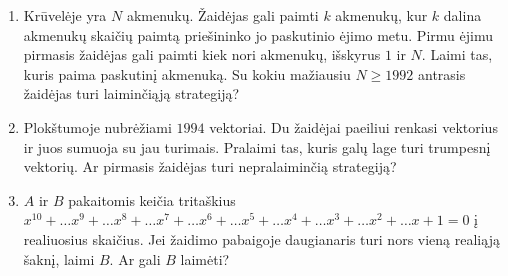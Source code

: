 \begin{enumerate}
  \item {} Krūvelėje yra $N$ akmenukų.
    Žaidėjas gali paimti $k$ akmenukų, kur $k$ dalina akmenukų skaičių paimtą
    priešininko jo paskutinio ėjimo metu. Pirmu ėjimu pirmasis žaidėjas gali
    paimti kiek nori akmenukų, išskyrus $1$ ir $N$. Laimi tas, kuris paima
    paskutinį akmenuką. Su kokiu mažiausiu $N\geq 1992$ antrasis žaidėjas
    turi laiminčiąją strategiją?

  \item Plokštumoje nubrėžiami $1994$ vektoriai. Du žaidėjai paeiliui renkasi
    vektorius ir juos sumuoja su jau turimais. Pralaimi tas, kuris galų lage
    turi trumpesnį vektorių. Ar pirmasis žaidėjas turi nepralaiminčią
    strategiją?

  \item $A$ ir $B$ pakaitomis keičia tritaškius $x^{10}+\dots x^9+\dots x^8+\dots
    x^7+\dots x^6+\dots x^5+\dots x^4+\dots x^3+\dots x^2+\dots x+1=0$ į
    realiuosius skaičius. Jei žaidimo pabaigoje daugianaris turi nors vieną
    realiąją šaknį, laimi $B$. Ar gali $B$ laimėti?


\end{enumerate}
